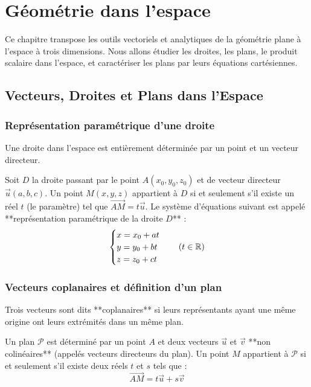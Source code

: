 \chapter{Géométrie dans l'espace}

Ce chapitre transpose les outils vectoriels et analytiques de la géométrie plane à l'espace à trois dimensions. Nous allons étudier les droites, les plans, le produit scalaire dans l'espace, et caractériser les plans par leurs équations cartésiennes.

\section{Vecteurs, Droites et Plans dans l'Espace}

\subsection{Représentation paramétrique d'une droite}

Une droite dans l'espace est entièrement déterminée par un point et un vecteur directeur.

\begin{definition}
Soit $D$ la droite passant par le point $A(x_0, y_0, z_0)$ et de vecteur directeur $\vec{u}(a, b, c)$.
Un point $M(x, y, z)$ appartient à $D$ si et seulement s'il existe un réel $t$ (le paramètre) tel que $\vec{AM} = t \vec{u}$.
Le système d'équations suivant est appelé **représentation paramétrique de la droite $D$** :
\[
\begin{cases}
x = x_0 + a t \\
y = y_0 + b t \\
z = z_0 + c t
\end{cases} \quad (t \in \mathbb{R})
\]
\end{definition}

\subsection{Vecteurs coplanaires et définition d'un plan}

\begin{definition}
Trois vecteurs sont dits **coplanaires** si leurs représentants ayant une même origine ont leurs extrémités dans un même plan.
\end{definition}

\begin{definition}
Un plan $\mathcal{P}$ est déterminé par un point $A$ et deux vecteurs $\vec{u}$ et $\vec{v}$ **non colinéaires** (appelés vecteurs directeurs du plan).
Un point $M$ appartient à $\mathcal{P}$ si et seulement s'il existe deux réels $t$ et $s$ tels que :
\[
\vec{AM} = t \vec{u} + s \vec{v}
\]
\end{definition}


